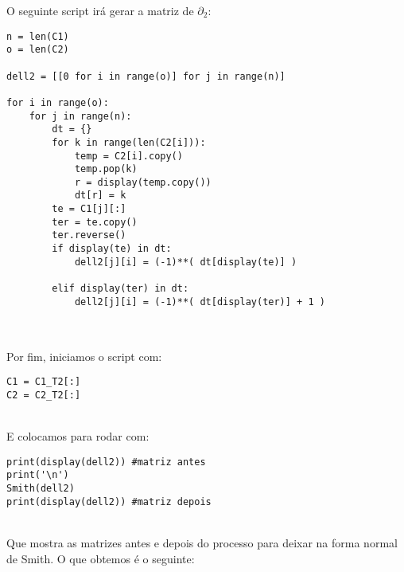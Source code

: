 \documentclass[12pt,a4paper]{article}
\theoremstyle{definition}
\begin{document}
O seguinte script irá gerar a matriz de $\partial_2$: \\ 

\begin{lstlisting}[language=iPython]
n = len(C1)
o = len(C2)

dell2 = [[0 for i in range(o)] for j in range(n)]

for i in range(o):
    for j in range(n):
        dt = {}
        for k in range(len(C2[i])):
            temp = C2[i].copy()
            temp.pop(k)
            r = display(temp.copy())
            dt[r] = k
        te = C1[j][:]
        ter = te.copy()
        ter.reverse()
        if display(te) in dt:
            dell2[j][i] = (-1)**( dt[display(te)] )

        elif display(ter) in dt:
            dell2[j][i] = (-1)**( dt[display(ter)] + 1 )
            
\end{lstlisting}\ \\

Por fim, iniciamos o script com: \\

\begin{lstlisting}[language=iPython]
C1 = C1_T2[:]
C2 = C2_T2[:]
\end{lstlisting}\ \\

E colocamos para rodar com: \\

\begin{lstlisting}[language=iPython]
print(display(dell2)) #matriz antes
print('\n')
Smith(dell2)
print(display(dell2)) #matriz depois
\end{lstlisting}\ \\

Que mostra as matrizes antes e depois do processo para deixar na forma normal de Smith. O que obtemos é o seguinte: \\
\end{document}

